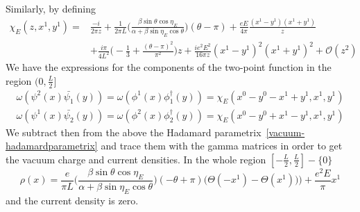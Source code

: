 Similarly, by defining 
\begin{equation}
\begin{split}
\chi_E(z, x^1, y^1) = 
& \frac{-i}{2 \pi z} + \frac{1}{2\pi L}\Big( \frac{\beta \sin \theta \cos \eta_E}{\alpha + \beta \sin \eta_E \cos \theta}\Big) (\theta - \pi) + \frac{eE}{4 \pi}\frac{(x^1 - y^1)(x^1 + y^1)}{z}     \\
& + \frac{i\pi}{4 L^2}\big( -\frac{1}{3} + \frac{(\theta - \pi)^2}{\pi^2}\big)z
+ \frac{i e^2 E^2}{16 \pi z} (x^1 - y^1)^2 (x^1 + y^1)^2
+ \mathcal{O}(z^2)
\end{split}
\end{equation}
We have the expressions for the components of the two-point function in the region $(0, \frac{L}{2}]$
\begin{equation*}
\begin{split}
\omega(\psi^2(x) \bar{\psi_1}(y)) = 
\omega(\phi^1(x) \phi^\dagger_1(y)) = \chi_E(x^0 - y^0 - x^1 + y^1, x^1, y^1) \\
 \omega(\psi^1(x) \bar{\psi_2}(y)) = 
\omega(\phi^2(x) \phi^\dagger_2(y)) = \chi_E(x^0 - y^0 + x^1 - y^1, x^1, y^1)
\end{split}
\end{equation*}
We subtract then from the above the Hadamard parametrix~\cref{vacuum-hadamardparametrix} and trace them with the gamma matrices in order to get the vacuum charge and current densities.
In the whole region $[-\frac L 2, \frac L 2] - \{0\}$ 
\begin{equation}\label{vacuum-rho-with-field}
\rho(x) = \frac{e}{\pi L}\Big( \frac{\beta \sin \theta \cos \eta_E}{\alpha + \beta \sin \eta_E \cos \theta}\Big) (-\theta + \pi)
\Big(\Theta(- x^1) - \Theta(x^1))\Big) + \frac{e^2 E}{\pi} x^1
\end{equation}
and the current density is zero. 
